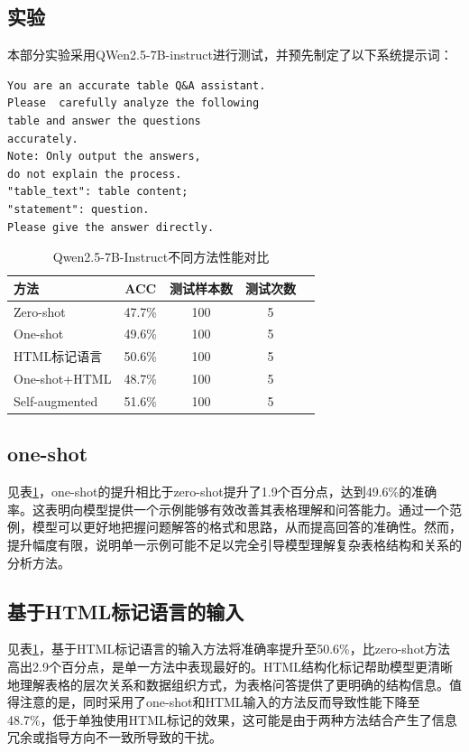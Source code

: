 \documentclass[10.5pt,compsoc]{CjC}
\theoremstyle{mystyle}
\begin{document}
\begin{CJK*}{UTF8}{zhhei}
\section{实验}
本部分实验采用QWen2.5-7B-instruct进行测试，并预先制定了以下系统提示词：
\begin{verbatim}
You are an accurate table Q&A assistant. 
Please  carefully analyze the following
table and answer the questions 
accurately.
Note: Only output the answers,
do not explain the process.
"table_text": table content;
"statement": question.
Please give the answer directly.
\end{verbatim}

\begin{table}[htbp]
\centering 
\caption{Qwen2.5-7B-Instruct不同方法性能对比}
\label{tab:full_performance}
\vspace{-2.5mm}
\begin{center}
\begin{tabular}{lcccc}
\toprule
\textbf{方法} & \textbf{ACC} & \textbf{测试样本数} & \textbf{测试次数}  \\
\midrule
Zero-shot & 47.7\% & 100 & 5  \\
One-shot & 49.6\% & 100 & 5 &  \\
HTML标记语言 & 50.6\% & 100 & 5  \\
One-shot+HTML & 48.7\% & 100 & 5  \\
Self-augmented & 51.6\% & 100 & 5  \\
\bottomrule
\end{tabular}
\end{center}
\end{table}

{\begin{CJK*}{UTF8}{zhhei}\subsection{one-shot}\end{CJK*}}
见表\ref{tab:full_performance}，one-shot的提升相比于zero-shot提升了1.9个百分点，达到49.6\%的准确率。这表明向模型提供一个示例能够有效改善其表格理解和问答能力。通过一个范例，模型可以更好地把握问题解答的格式和思路，从而提高回答的准确性。然而，提升幅度有限，说明单一示例可能不足以完全引导模型理解复杂表格结构和关系的分析方法。

{\begin{CJK*}{UTF8}{zhhei}\subsection{基于HTML标记语言的输入}\end{CJK*}}
见表\ref{tab:full_performance}，基于HTML标记语言的输入方法将准确率提升至50.6\%，比zero-shot方法高出2.9个百分点，是单一方法中表现最好的。HTML结构化标记帮助模型更清晰地理解表格的层次关系和数据组织方式，为表格问答提供了更明确的结构信息。值得注意的是，同时采用了one-shot和HTML输入的方法反而导致性能下降至48.7\%，低于单独使用HTML标记的效果，这可能是由于两种方法结合产生了信息冗余或指导方向不一致所导致的干扰。


\end{CJK*}
\end{document}
